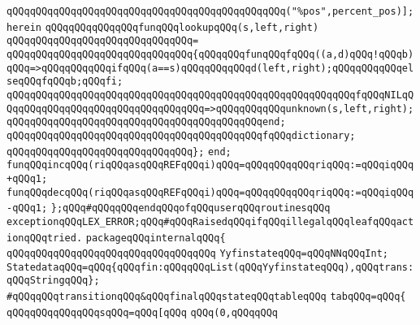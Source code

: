 \verb|qQQqqQQqqQQqqQQqqQQqqQQqqQQqqQQqqQQqqQQqqQQqqQQq("%pos",percent_pos)];|\newline
\verb|herein|\newline
\verb|qQQqqQQqqQQqqQQqfunqQQqlookupqQQq(s,left,right)|\newline
\verb|qQQqqQQqqQQqqQQqqQQqqQQqqQQqqQQq=|\newline
\verb|qQQqqQQqqQQqqQQqqQQqqQQqqQQqqQQq{qQQqqQQqfunqQQqfqQQq((a,d)qQQq!qQQqb)qQQq=>qQQqqQQqqQQqifqQQq(a==s)qQQqqQQqqQQqd(left,right);qQQqqQQqqQQqelseqQQqfqQQqb;qQQqfi;|\newline
\verb|qQQqqQQqqQQqqQQqqQQqqQQqqQQqqQQqqQQqqQQqqQQqqQQqqQQqqQQqqQQqfqQQqNILqQQqqQQqqQQqqQQqqQQqqQQqqQQqqQQqqQQq=>qQQqqQQqqQQqunknown(s,left,right);|\newline
\verb|qQQqqQQqqQQqqQQqqQQqqQQqqQQqqQQqqQQqqQQqqQQqend;|\newline
\newline
\verb|qQQqqQQqqQQqqQQqqQQqqQQqqQQqqQQqqQQqqQQqqQQqfqQQqdictionary;|\newline
\verb|qQQqqQQqqQQqqQQqqQQqqQQqqQQqqQQq};|\newline
\verb|end;|\newline
\newline
\verb|funqQQqincqQQq(riqQQqasqQQqREFqQQqi)qQQq=qQQqqQQqqQQqriqQQq:=qQQqiqQQq+qQQq1;|\newline
\verb|funqQQqdecqQQq(riqQQqasqQQqREFqQQqi)qQQq=qQQqqQQqqQQqriqQQq:=qQQqiqQQq-qQQq1;|\newline
\newline
\verb|};qQQq#qQQqqQQqendqQQqofqQQquserqQQqroutinesqQQq|\newline
\verb|exceptionqQQqLEX_ERROR;qQQq#qQQqRaisedqQQqifqQQqillegalqQQqleafqQQqactionqQQqtried.|\newline
\verb|packageqQQqinternalqQQq{|\newline
\verb|qQQqqQQqqQQqqQQqqQQqqQQqqQQqqQQqqQQq|\newline
\newline
\verb|YyfinstateqQQq=qQQqNNqQQqInt;|\newline
\verb|StatedataqQQq=qQQq{qQQqfin:qQQqqQQqList(qQQqYyfinstateqQQq),qQQqtrans:qQQqStringqQQq};|\newline
\verb|#qQQqqQQqtransitionqQQq&qQQqfinalqQQqstateqQQqtableqQQq|\newline
\verb|tabqQQq=qQQq{|\newline
\verb|qQQqqQQqqQQqqQQqsqQQq=qQQq[qQQq|\newline
\verb|qQQq(0,qQQqqQQq|\newline
